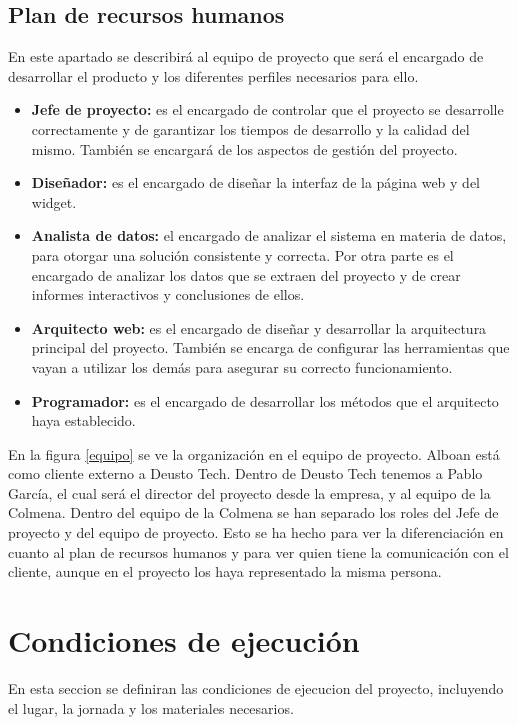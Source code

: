 \subsection{Plan de recursos humanos}
En este apartado se describirá al equipo de proyecto que será el encargado de desarrollar el producto y los diferentes perfiles necesarios para ello.

\begin{itemize}
	\item \textbf{Jefe de proyecto:} es el encargado de controlar que el proyecto se desarrolle correctamente y de garantizar los tiempos de desarrollo y la calidad del mismo. También se encargará de los aspectos de gestión del proyecto.
	\item \textbf{Diseñador:} es el encargado de diseñar la interfaz de la página web y del widget.
	\item \textbf{Analista de datos:} el encargado de analizar el sistema en materia de datos, para otorgar una solución consistente y correcta. Por otra parte es el encargado de analizar los datos que se extraen del proyecto y de crear informes interactivos y conclusiones de ellos.
	\item \textbf{Arquitecto web:} es el encargado de diseñar y desarrollar la arquitectura principal del proyecto. También se encarga de configurar las herramientas que vayan a utilizar los demás para asegurar su correcto funcionamiento.
	\item \textbf{Programador:} es el encargado de desarrollar los métodos que el arquitecto haya establecido.
\end{itemize}

En la figura \ref{equipo}  se ve la organización en el equipo de proyecto. Alboan está como cliente externo a Deusto Tech. Dentro de Deusto Tech tenemos a Pablo García, el cual será el director del proyecto desde la empresa, y al equipo de la Colmena. Dentro del equipo de la Colmena se han separado los roles del Jefe de proyecto y del equipo de proyecto. Esto se ha hecho para ver la diferenciación en cuanto al plan de recursos humanos y para ver quien tiene la comunicación con el cliente, aunque en el proyecto los haya representado la misma persona.


\section{Condiciones de ejecución}
En esta seccion se definiran las condiciones de ejecucion del proyecto, incluyendo el lugar, la jornada y los materiales necesarios.

